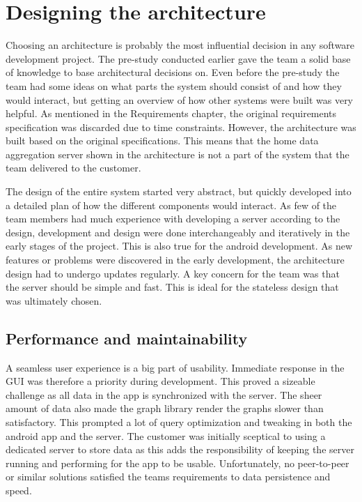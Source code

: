 \section{Designing the architecture}
Choosing an architecture is probably the most influential decision in any software development project. The pre-study conducted earlier gave the team a solid base of knowledge to base architectural  decisions on. Even before the pre-study the team had some ideas on what parts the system should consist of and how they would interact, but getting an overview of how other systems were built was very helpful. As mentioned in the Requirements chapter, the original requirements specification was discarded due to time constraints. However, the architecture was built based on the original specifications. This means that the home data aggregation server shown in the architecture is not a part of the system that the team delivered to the customer.

The design of the entire system started very abstract, but quickly developed into a detailed plan of how the different components would interact. As few of the team members had much experience with developing a server according to the design, development and design were done interchangeably and iteratively in the early stages of the project. This is also true for the android development. As new features or problems were discovered in the early development, the architecture design had to undergo updates regularly. A key concern for the team was that the server should be simple and fast. This is ideal for the stateless design that was ultimately chosen. 

\subsection{Performance and maintainability}
A seamless user experience is a big part of usability. Immediate response in the GUI was therefore a priority during development. This proved a sizeable challenge as all data in the app is synchronized with the server. The sheer amount of data also made the graph library render the graphs slower than satisfactory. This prompted a lot of query optimization and tweaking in both the android app and the server. The customer was initially sceptical to using a dedicated server to store data as this adds the responsibility of keeping the server running and performing for the app to be usable. Unfortunately, no peer-to-peer or similar solutions satisfied the teams requirements to data persistence and speed.

